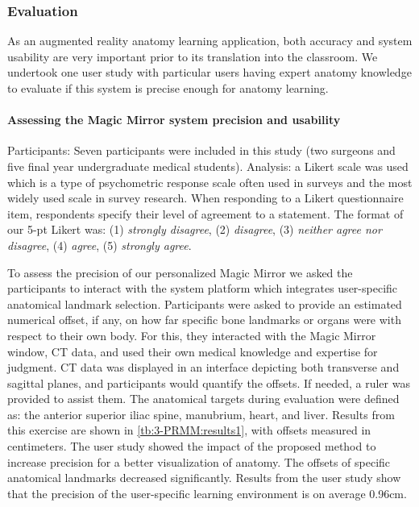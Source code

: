 \subsubsection{Evaluation}
As an augmented reality anatomy learning application, both accuracy and system usability are very important prior to its translation into the classroom. We undertook one user study with particular users having expert anatomy knowledge to evaluate if this system is precise enough for anatomy learning.%

\paragraph{Assessing the Magic Mirror system precision and usability}
Participants: Seven participants were included in this study (two surgeons and five final year undergraduate medical students). 
Analysis: a Likert scale was used which is a type of psychometric response scale often used in surveys and the most widely used scale in survey research. When responding to a Likert questionnaire item, respondents specify their level of agreement to a statement. The format of our 5-pt Likert was: (1) \textit{strongly disagree}, (2) \textit{disagree}, (3) \textit{neither agree nor disagree}, (4) \textit{agree}, (5) \textit{strongly agree}. 

To assess the precision of our personalized Magic Mirror we asked the participants to interact with the system platform which integrates user-specific anatomical landmark selection. Participants were asked to provide an estimated numerical offset, if any, on how far specific bone landmarks or organs were with respect to their own body. For this, they interacted with the Magic Mirror window, CT data, and used their own medical knowledge and expertise for judgment. CT data was displayed in an interface depicting both transverse and sagittal planes, and participants would quantify the offsets. If needed, a ruler was provided to assist them. The anatomical targets during evaluation were defined as: the anterior superior iliac spine, manubrium, heart, and liver. 
Results from this exercise are shown in \tablename{\ref{tb:3-PRMM:results1}}, with offsets measured in centimeters.  The user study showed the impact of the proposed method to increase precision for a better visualization of anatomy. The offsets of specific anatomical landmarks decreased significantly. Results from the user study show that the precision of the user-specific learning environment is on average 0.96cm.


